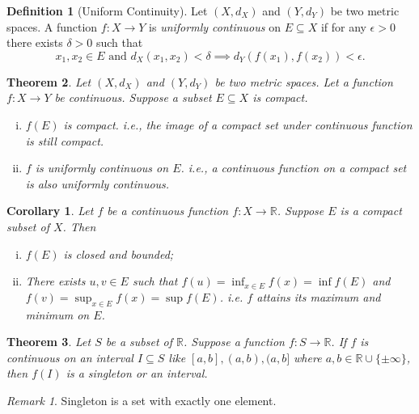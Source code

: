 \documentclass[12pt, lettersize]{book}
\theoremstyle{plain}
\newtheorem{thm}{Theorem}[section]
\newtheorem{cor}{Corollary}[thm]
\theoremstyle{definition}
\newtheorem{dfn}[thm]{Definition}
\theoremstyle{remark}
\newtheorem*{rem}{Remark}
\newcommand{\R}{\mathbb{R}}
\begin{document}
		\begin{dfn}[Uniform Continuity]
			Let $(X,d_X)$ and $(Y,d_Y)$ be two metric spaces. A function $f: X\rightarrow Y$ is \emph{uniformly continuous} on $E\subseteq X$ if for any $\epsilon>0$ there exists $\delta>0$ such that
			\begin{displaymath}
				x_1,x_2\in E\text{ and }d_X(x_1,x_2)<\delta\implies d_Y(f(x_1),f(x_2))<\epsilon.
			\end{displaymath} 
		\end{dfn}
		
		\begin{thm}
			Let $(X,d_X)$ and $(Y,d_Y)$ be two metric spaces. Let a function $f:X\rightarrow Y$ be continuous. Suppose a subset $E\subseteq X$ is compact.
			\begin{enumerate}[(i)]
				\item $f(E)$ is compact. i.e., the image of a compact set under continuous function is still compact.
				\item $f$ is uniformly continuous on $E$. i.e., a continuous function on a compact set is also uniformly continuous.
			\end{enumerate}
		\end{thm}
		\begin{cor}
			Let $f$ be a continuous function $f:X\rightarrow\R$. Suppose $E$ is a compact subset of $X$. Then
			\begin{enumerate}[(i)]
				\item $f(E)$ is closed and bounded;
				\item There exists $u,v\in E$ such that $f(u)=\inf_{x\in E}f(x)=\inf f(E)$ and $f(v)=\sup_{x\in E}f(x)=\sup f(E)$. i.e. $f$ attains its \emph{maximum} and \emph{minimum} on $E$.
			\end{enumerate}
		\end{cor}
		
		\begin{thm}
			Let $S$ be a subset of $\R$. Suppose a function $f:S\rightarrow\R$. If $f$ is continuous on an interval $I\subseteq S$ like $[a,b],(a,b),(a,b]$ where $a,b\in\R\cup\{\pm\infty\}$, then $f(I)$ is a singleton or an interval.
		\end{thm}
		\begin{rem}
			Singleton is a set with exactly one element.
		\end{rem}
		
\end{document}
